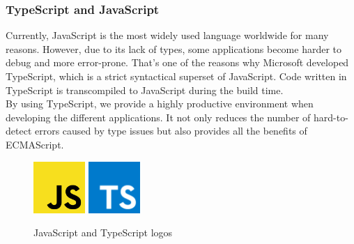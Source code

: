 \documentclass[../memory.tex]{subfiles}
\begin{document}
\subsubsection{TypeScript and JavaScript}
Currently, JavaScript is the most widely used language worldwide for many
reasons. However, due to its lack of types, some applications become harder to
debug and more error-prone. That's one of the reasons why Microsoft developed
TypeScript, which is a strict syntactical superset of JavaScript. Code written
in TypeScript is transcompiled to JavaScript during the build time.
\\
By using TypeScript, we provide a highly productive environment when developing
the different applications. It not only reduces the number of hard-to-detect
errors caused by type issues but also provides all the benefits of ECMAScript.
\begin{figure}[H]
	\centering
	\includegraphics[width=0.175\textwidth]{./assets/logos/js-logo.png}
	\includegraphics[width=0.175\textwidth]{./assets/logos/ts-logo.png}
	\caption{JavaScript and TypeScript logos}
\end{figure}
\end{document}
